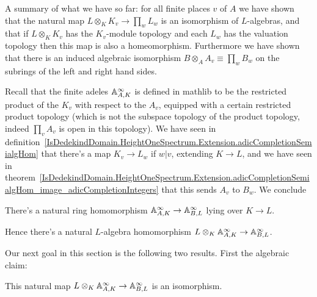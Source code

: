 A summary of what we have so far: for all finite places $v$ of $A$
we have shown that the natural map $L\otimes_KK_v\to\prod_wL_w$
is an isomorphism of $L$-algebras, and that if $L\otimes_KK_v$ has
the $K_v$-module topology and each $L_w$ has the valuation topology
then this map is also a homeomorphism. Furthermore we have shown
that there is an induced algebraic isomorphism $B\otimes_AA_v\equiv\prod_w B_w$
on the subrings of the left and right hand sides.

Recall that the finite adeles $\mathbb{A}_{A,K}^\infty$ is defined in mathlib to be
the restricted product of the $K_v$ with respect to the $A_v$, equipped with a certain
restricted product topology (which is not the subspace topology of the product
topology, indeed $\prod_v A_v$ is open in this topology). We have seen in
definition~\ref{IsDedekindDomain.HeightOneSpectrum.Extension.adicCompletionSemialgHom} that
there's a map $K_v\to L_w$ if $w|v$, extending $K\to L$, and we have seen in
theorem~\ref{IsDedekindDomain.HeightOneSpectrum.Extension.adicCompletionSemialgHom_image_adicCompletionIntegers}
that this sends $A_v$ to $B_w$. We conclude

\begin{definition}
  \label{IsDedekindDomain.FiniteAdeleRing.mapSemialgHom}
  \leanok
  There's a natural ring homomorphism
  $\mathbb{A}_{A,K}^\infty\to\mathbb{A}_{B,L}^\infty$ lying over $K\to L$.
\end{definition}

Hence there's a natural $L$-algebra homomorphism $L\otimes_K\mathbb{A}_{A,K}^\infty\to\mathbb{A}_{B,L}^\infty$.

Our next goal in this section is the following two results. First the algebraic claim:

\begin{theorem}
  \label{IsDedekindDomain.FiniteAdeleRing.baseChangeAlgEquiv}
  \leanok
  This natural map $L\otimes_K\mathbb{A}_{A,K}^\infty\to\mathbb{A}_{B,L}^\infty$ is an isomorphism.
\end{theorem}

